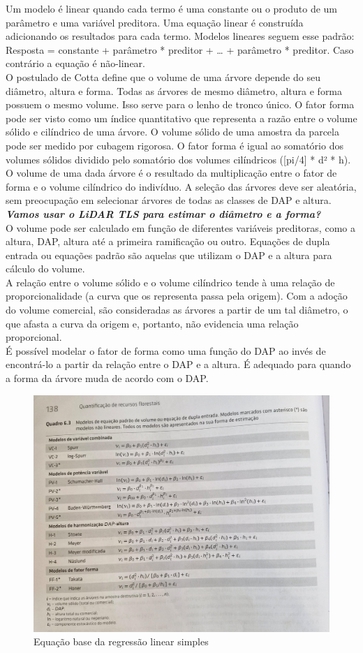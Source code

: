 \documentclass[
]{article}
\begin{document}
Um modelo é linear quando cada termo é uma constante ou o produto de um
parâmetro e uma variável preditora. Uma equação linear é construída
adicionando os resultados para cada termo. Modelos lineares seguem esse
padrão: Resposta = constante + parâmetro * preditor + \ldots{} +
parâmetro * preditor. Caso contrário a equação é não-linear.\\
O postulado de Cotta define que o volume de uma árvore depende do seu
diâmetro, altura e forma. Todas as árvores de mesmo diâmetro, altura e
forma possuem o mesmo volume. Isso serve para o lenho de tronco único. O
fator forma pode ser visto como um índice quantitativo que representa a
razão entre o volume sólido e cilíndrico de uma árvore. O volume sólido
de uma amostra da parcela pode ser medido por cubagem rigorosa. O fator
forma é igual ao somatório dos volumes sólidos dividido pelo somatório
dos volumes cilíndricos ({[}pi/4{]} * d² * h).\\
O volume de uma dada árvore é o resultado da multiplicação entre o fator
de forma e o volume cilíndrico do indivíduo. A seleção das árvores deve
ser aleatória, sem preocupação em selecionar árvores de todas as classes
de DAP e altura. \textbf{\emph{Vamos usar o LiDAR TLS para estimar o
diâmetro e a forma?}}\\
O volume pode ser calculado em função de diferentes variáveis
preditoras, como a altura, DAP, altura até a primeira ramificação ou
outro. Equações de dupla entrada ou equações padrão são aquelas que
utilizam o DAP e a altura para cálculo do volume.\\
A relação entre o volume sólido e o volume cilíndrico tende à uma
relação de proporcionalidade (a curva que os representa passa pela
origem). Com a adoção do volume comercial, são consideradas as árvores a
partir de um tal diâmetro, o que afasta a curva da origem e, portanto,
não evidencia uma relação proporcional.\\
É possível modelar o fator de forma como uma função do DAP ao invés de
encontrá-lo a partir da relação entre o DAP e a altura. É adequado para
quando a forma da árvore muda de acordo com o DAP.

\begin{figure}

{\centering \includegraphics[width=0.8\linewidth]{IMAGES/dupla-entrada-volume} 

}

\caption{Equação base da regressão linear simples}\label{fig:unnamed-chunk-24}
\end{figure}
\end{document}
